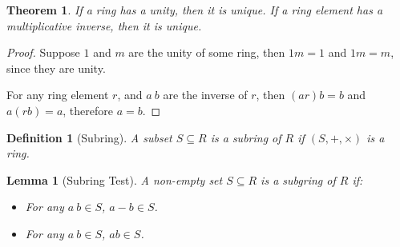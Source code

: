 \documentclass[14pt]{extarticle}
\newtheorem{theorem}{Theorem}[section]
\newtheorem{lemma}{Lemma}[section]
\newtheorem{definition}{Definition}[section]
\newcommand{\1}{\{e\}}
\begin{document}
\begin{theorem}
  If a ring has a unity, then it is unique. 
  If a ring element has a multiplicative inverse, then it is unique.
\end{theorem}
\begin{proof}
  Suppose $1$ and $m$ are the unity of some ring,
  then $1m = 1$ and $1m = m$, since they are unity.

  For any ring element $r$, and $a \ b$ are the inverse of $r$,
  then $(ar)b = b$ and $a(rb) = a$, therefore $a = b$.
\end{proof}

\begin{definition}[Subring]
  A subset $S \subseteq R$ is a subring of $R$ if $(S, +, \times)$ is a ring.
\end{definition}

\begin{lemma}[Subring Test]
  A non-empty set $S \subseteq R$ is a subgring of $R$ if:
  \begin{itemize}
    \item For any $a \ b \in S$, $a - b \in S$.
    \item For any $a \ b \in S$, $ab \in S$.
  \end{itemize}
\end{lemma}
\end{document}
